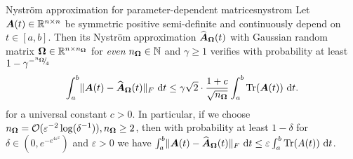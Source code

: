 \documentclass[12pt]{article}
\begin{document}
\begin{lemma}{Nyström approximation for parameter-dependent matrices}{nystrom}
    Let $\boldsymbol{A}(t) \in \mathbb{R}^{n \times n}$ be symmetric positive semi-definite and continuously depend on $t \in [a, b]$. Then its Nyström approximation $\widehat{\boldsymbol{A}}_{\boldsymbol{\Omega}}(t)$ with Gaussian random matrix $\boldsymbol{\Omega} \in \mathbb{R}^{n \times n_{\boldsymbol{\Omega}}}$ for \emph{even} $n_{\boldsymbol{\Omega}} \in \mathbb{N}$ and $\gamma \geq 1$ verifies with probability at least $1 - \gamma^{-{}^{n_{\boldsymbol{\Omega}}}{\mskip -5mu/\mskip -3mu}_{4}}$
    \begin{equation}
        \int_{a}^{b} \lVert \boldsymbol{A}(t) - \widehat{\boldsymbol{A}}_{\boldsymbol{\Omega}}(t) \rVert _F~\mathrm{d}t \leq \gamma \sqrt{2} \cdot \frac{1 + c}{\sqrt{n_{\boldsymbol{\Omega}}}} \int_{a}^{b} \operatorname{Tr}(\boldsymbol{A}(t))~\mathrm{d}t.
    \end{equation}
    for a universal constant $c > 0$. In particular, if we choose $n_{\boldsymbol{\Omega}} = \mathcal{O}(\varepsilon^{-2} \log(\delta^{-1})), n_{\boldsymbol{\Omega}} \geq 2$, then with probability at least $1-\delta$ for $\delta \in (0, e^{-e^{4 \varepsilon^2}})$ and $\varepsilon > 0$ we have $\int_{a}^{b} \lVert \boldsymbol{A}(t) - \widehat{\boldsymbol{A}}_{\boldsymbol{\Omega}}(t) \rVert _F~\mathrm{d}t \leq \varepsilon \int_{a}^{b} \operatorname{Tr}(A(t))~\mathrm{d}t$.
\end{lemma}

\end{document}
